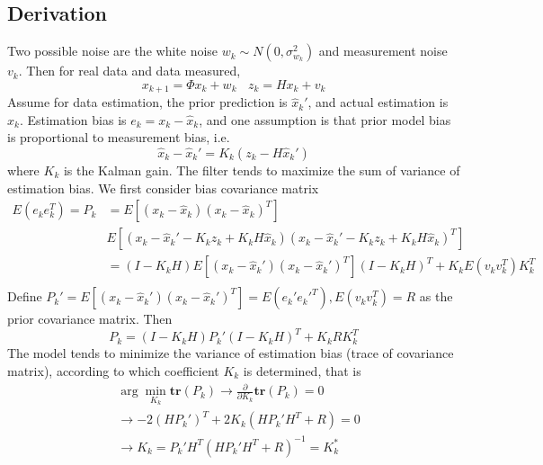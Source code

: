 \documentclass[12pt]{article}
\newcommand{\tr}{\bm{tr}}
\begin{document}
    \subsection{Derivation}
    Two possible noise are the white noise $w_k \sim N(0, \sigma_{w_k}^2)$ and measurement noise $v_k$. Then for real data and data measured, 
    \begin{equation}
        x_{k+1} = \Phi x_k + w_k~~~~z_{k} = Hx_k + v_k
    \end{equation}
    Assume for data estimation, the prior prediction is $\hat x_k'$, and actual estimation is $\hat x_k$. Estimation bias is $e_k = x_k - \hat x_k$, and one assumption is that prior model bias is proportional to measurement bias, i.e.
    \begin{equation}
        \hat x_k - \hat x_k' = K_k(z_k - H\hat x_k')
    \end{equation}
    where $K_k$ is the Kalman gain. The filter tends to maximize the sum of variance of estimation bias. We first consider bias covariance matrix
    \begin{equation}
    \begin{aligned}
        E(e_ke_k^T) = P_k &= E[(x_k - \hat x_k)(x_k - \hat x_k)^T] \\
        &E[(x_k - \hat x_k' - K_kz_k + K_kH\hat x_k)(x_k - \hat x_k' - K_kz_k + K_kH\hat x_k)^T] \\
        &= (I - K_kH)E[(x_k - \hat x_k')(x_k - \hat x_k')^T](I-K_kH)^T + K_kE(v_kv_k^T)K_k^T \\
    \end{aligned}
    \end{equation}
    Define $P_k' = E[(x_k - \hat x_k')(x_k - \hat x_k')^T] = E(e_k'e_k'^T), E(v_kv_k^T) = R$ as the prior covariance matrix. Then
    \begin{equation}
        P_k = (I-K_kH)P_k'(I-K_kH)^T + K_kRK_k^T
    \end{equation}
    The model tends to minimize the variance of estimation bias (trace of covariance matrix), according to which coefficient $K_k$ is determined, that is
    \begin{equation}
    \begin{aligned}
        &\arg \min_{K_k} \tr (P_k) \rightarrow \frac{\partial}{\partial K_k}\tr(P_k) = 0\\
        &\longrightarrow  -2(H P_k')^T + 2K_k(HP_k' H^T + R) = 0 \\
        &\longrightarrow K_k = P_k'H^T (HP_k'H^T + R)^{-1} = K_k^{*}
    \end{aligned}
    \end{equation}
\end{document}
